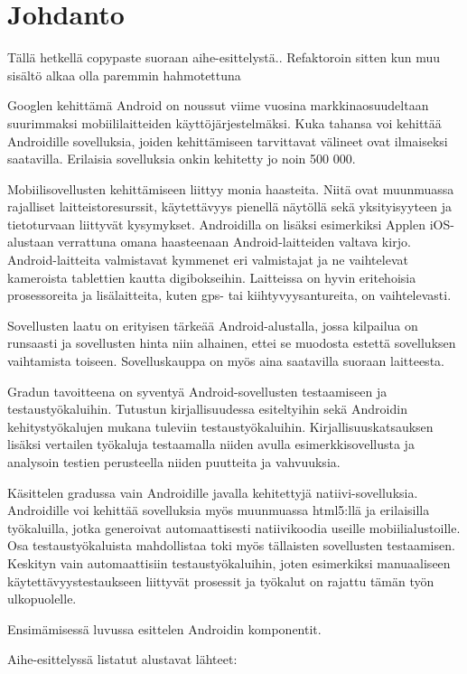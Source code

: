 \section{Johdanto}

Tällä hetkellä copypaste suoraan aihe-esittelystä.. Refaktoroin sitten kun muu sisältö alkaa olla paremmin hahmotettuna

Googlen kehittämä Android on noussut viime vuosina markkinaosuudeltaan suurimmaksi mobiililaitteiden käyttöjärjestelmäksi. Kuka tahansa voi kehittää Androidille sovelluksia, joiden kehittämiseen tarvittavat välineet ovat ilmaiseksi saatavilla. Erilaisia sovelluksia onkin kehitetty jo noin 500 000.

Mobiilisovellusten kehittämiseen liittyy monia haasteita. Niitä ovat muunmuassa rajalliset laitteistoresurssit, käytettävyys pienellä näytöllä sekä yksityisyyteen ja tietoturvaan liittyvät kysymykset. Androidilla on lisäksi esimerkiksi Applen iOS-alustaan verrattuna omana haasteenaan Android-laitteiden valtava kirjo. Android-laitteita valmistavat kymmenet eri valmistajat ja ne vaihtelevat kameroista tablettien kautta digibokseihin. Laitteissa on hyvin eritehoisia prosessoreita ja lisälaitteita, kuten gps- tai kiihtyvyysantureita, on vaihtelevasti.

Sovellusten laatu on erityisen tärkeää Android-alustalla, jossa kilpailua on runsaasti ja sovellusten hinta niin alhainen, ettei se muodosta estettä sovelluksen vaihtamista toiseen. Sovelluskauppa on myös aina saatavilla suoraan laitteesta.

Gradun tavoitteena on syventyä Android-sovellusten testaamiseen ja testaustyökaluihin. Tutustun kirjallisuudessa esiteltyihin sekä Androidin kehitystyökalujen mukana tuleviin testaustyökaluihin. Kirjallisuuskatsauksen lisäksi vertailen työkaluja testaamalla niiden avulla esimerkkisovellusta ja analysoin testien perusteella niiden puutteita ja vahvuuksia.

Käsittelen gradussa vain Androidille javalla kehitettyjä natiivi-sovelluksia. Androidille voi kehittää sovelluksia myös muunmuassa html5:llä ja erilaisilla työkaluilla, jotka generoivat automaattisesti natiivikoodia useille mobiilialustoille. Osa testaustyökaluista mahdollistaa toki myös tällaisten sovellusten testaamisen. Keskityn vain automaattisiin testaustyökaluihin, joten esimerkiksi manuaaliseen käytettävyystestaukseen liittyvät prosessit ja työkalut on rajattu tämän työn ulkopuolelle.

Ensimämisessä luvussa esittelen Androidin komponentit.

Aihe-esittelyssä listatut alustavat lähteet: 
\cite{takalaetal11} 
\cite{hyungkeunetal11}
\cite{maetal11}
\cite{spataru10}
\cite{kropp10}
\cite{mirzaeietal12}
\cite{hu10}
\cite{wasserman10}
\cite{hampark11}